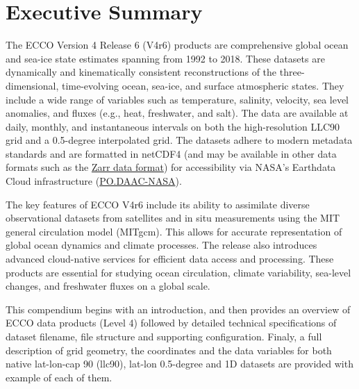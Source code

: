 \pagebreak\section{Executive Summary}
\par \vspace{0.5cm}

The ECCO Version 4 Release 6 (V4r6) products are comprehensive global ocean and sea-ice state estimates spanning 
from 1992 to 2018. These datasets are dynamically and kinematically consistent reconstructions of the three-dimensional, 
time-evolving ocean, sea-ice, and surface atmospheric states. They include a wide range of variables such as temperature, 
salinity, velocity, sea level anomalies, and fluxes (e.g., heat, freshwater, and salt). The data are available at daily, 
monthly, and instantaneous intervals on both the high-resolution LLC90 grid and a 0.5-degree interpolated grid. The datasets 
adhere to modern metadata standards and are formatted in netCDF4 (and may be available in other data formats such as the
\href{https://en.wikipedia.org/wiki/Zarr_(data_format)}{Zarr data format}) for accessibility via NASA's 
Earthdata Cloud infrastructure (\href{https://podaac.jpl.nasa.gov/}{PO.DAAC-NASA}).

The key features of ECCO V4r6 include its ability to assimilate diverse observational datasets from satellites 
and in situ measurements using the MIT general circulation model (MITgcm). This allows for accurate representation 
of global ocean dynamics and climate processes. The release also introduces advanced cloud-native services for efficient 
data access and processing. These products are essential for studying ocean circulation, climate variability, sea-level 
changes, and freshwater fluxes on a global scale.

This compendium begins with an introduction, and then provides an
overview of ECCO data products (Level 4) followed by detailed technical specifications of dataset filename, 
file structure and supporting configuration. Finaly, a full description of grid geometry, the coordinates and the 
data variables for both native lat-lon-cap 90 (llc90), lat-lon 0.5-degree and 1D datasets are provided with example of each of them.


